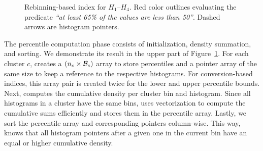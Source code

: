 \begin{figure}[t]
    \centering
    \caption{Rebinning-based \system{} index for $H_1$--$H_4$. Red color outlines evaluating the predicate \textit{``at least 65\% of the values are less than 50''}. Dashed arrows are histogram pointers.}
    \label{fig:percentile_computation_and_querying}
    \vspace{-0.4em}
\end{figure}

The percentile computation phase consists of initialization, density summation, and sorting.
We demonstrate its result in the upper part of Figure~\ref{fig:percentile_computation_and_querying}.
For each cluster $c$, \system{} creates a $(n_c \times \mathcal{B}_c)$ array to store percentiles and a pointer array of the same size to keep a reference to the respective histograms.
For conversion-based indices, this array pair is created twice for the lower and upper percentile bounds.
Next, \system{} computes the cumulative density per cluster bin and histogram.
Since all histograms in a cluster have the same bins, \system{} uses vectorization to compute the cumulative sums efficiently and stores them in the percentile array.
Lastly, we sort the percentile array and corresponding pointers column-wise.
This way, \system{} knows that all histogram pointers after a given one in the current bin have an equal or higher cumulative density.

